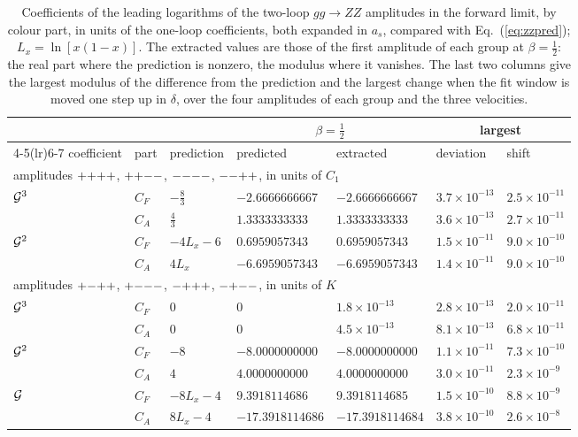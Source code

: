 \begin{table}[!htb]
\centering
\small
\begin{tabular}{lllllll}
\toprule
&&&\multicolumn{2}{c}{$\beta=\frac12$}&\multicolumn{2}{c}{largest}\\
\cmidrule(lr){4-5}\cmidrule(lr){6-7}
coefficient & part & prediction & predicted & extracted & deviation & shift\\
\midrule
\multicolumn{7}{l}{amplitudes ${+}{+}{+}{+}$, ${+}{+}{-}{-}$, ${-}{-}{-}{-}$, ${-}{-}{+}{+}$, in units of $C_1$}\\
$\mathcal G^3$ & $C_F$ & $-\frac83$ & $-2.6666666667$ & $-2.6666666667$ & $3.7\times10^{-13}$ & $2.5\times10^{-11}$\\
 & $C_A$ & $\frac43$ & $1.3333333333$ & $1.3333333333$ & $3.6\times10^{-13}$ & $2.7\times10^{-11}$\\
$\mathcal G^2$ & $C_F$ & $-4L_x-6$ & $0.6959057343$ & $0.6959057343$ & $1.5\times10^{-11}$ & $9.0\times10^{-10}$\\
 & $C_A$ & $4L_x$ & $-6.6959057343$ & $-6.6959057343$ & $1.4\times10^{-11}$ & $9.0\times10^{-10}$\\
\midrule
\multicolumn{7}{l}{amplitudes ${+}{-}{+}{+}$, ${+}{-}{-}{-}$, ${-}{+}{+}{+}$, ${-}{+}{-}{-}$, in units of $K$}\\
$\mathcal G^3$ & $C_F$ & $0$ & $0$ & $1.8\times10^{-13}$ & $2.8\times10^{-13}$ & $2.0\times10^{-11}$\\
 & $C_A$ & $0$ & $0$ & $4.5\times10^{-13}$ & $8.1\times10^{-13}$ & $6.8\times10^{-11}$\\
$\mathcal G^2$ & $C_F$ & $-8$ & $-8.0000000000$ & $-8.0000000000$ & $1.1\times10^{-11}$ & $7.3\times10^{-10}$\\
 & $C_A$ & $4$ & $4.0000000000$ & $4.0000000000$ & $3.0\times10^{-11}$ & $2.3\times10^{-9}$\\
$\mathcal G$ & $C_F$ & $-8L_x-4$ & $9.3918114686$ & $9.3918114685$ & $1.5\times10^{-10}$ & $8.8\times10^{-9}$\\
 & $C_A$ & $8L_x-4$ & $-17.3918114686$ & $-17.3918114684$ & $3.8\times10^{-10}$ & $2.6\times10^{-8}$\\
\bottomrule
\end{tabular}
\caption{Coefficients of the leading logarithms of the two-loop $gg\to ZZ$ amplitudes in the forward limit, by colour part, in units of the one-loop coefficients, both expanded in $a_s$, compared with Eq.~(\ref{eq:zzpred}); $L_x=\ln[x(1-x)]$. The extracted values are those of the first amplitude of each group at $\beta=\frac12$: the real part where the prediction is nonzero, the modulus where it vanishes. The last two columns give the largest modulus of the difference from the prediction and the largest change when the fit window is moved one step up in $\delta$, over the four amplitudes of each group and the three velocities.}
\label{tab:zz}
\end{table}
